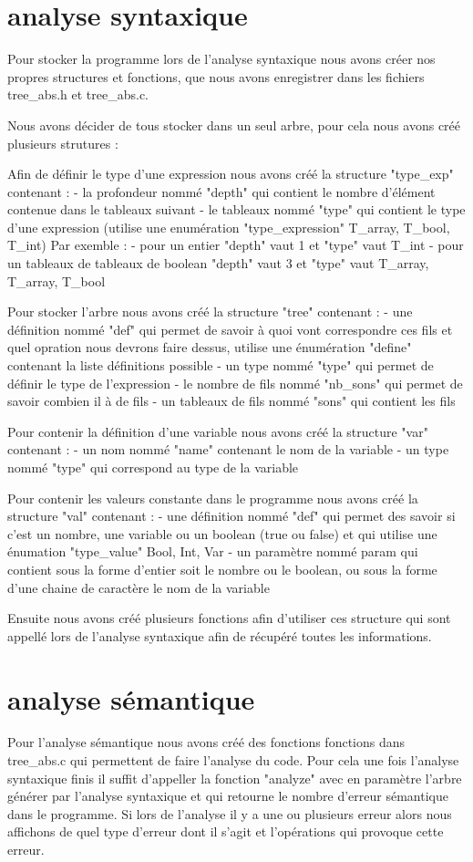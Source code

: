 ﻿\documentclass{report}
\begin{document}
\section{analyse syntaxique}
Pour stocker la programme lors de l'analyse syntaxique nous avons créer nos propres structures et fonctions, que nous avons enregistrer dans les fichiers tree_abs.h et tree_abs.c.

Nous avons décider de tous stocker dans un seul arbre, pour cela nous avons créé plusieurs strutures :

Afin de définir le type d'une expression nous avons créé la structure "type_exp" contenant :
	- la profondeur nommé "depth" qui contient le nombre d'élément contenue dans le tableaux suivant
	- le tableaux nommé "type" qui contient le type d'une expression (utilise une enumération "type_expression" {T_array, T_bool, T_int})
Par exemble :
	- pour un entier "depth" vaut 1 et "type" vaut {T_int}
	- pour un tableaux de tableaux de boolean "depth" vaut 3 et "type" vaut {T_array, T_array, T_bool}

Pour stocker l'arbre nous avons créé la structure "tree" contenant :
	- une définition nommé "def" qui permet de savoir à quoi vont correspondre ces fils et quel opration nous devrons faire dessus, utilise une énumération "define" contenant la liste définitions possible
	- un type nommé "type" qui permet de définir le type de l'expression
	- le nombre de fils nommé "nb_sons" qui permet de savoir combien il à de fils
	- un tableaux de fils nommé "sons" qui contient les fils
	
Pour contenir la définition d'une variable nous avons créé la structure "var" contenant :
	- un nom nommé "name" contenant le nom de la variable
	- un type nommé "type" qui correspond au type de la variable
	
Pour contenir les valeurs constante dans le programme nous avons créé la structure "val" contenant :
	- une définition nommé "def" qui permet des savoir si c'est un nombre, une variable ou un boolean (true ou false) et qui utilise une énumation "type_value" {Bool, Int, Var}
	- un paramètre nommé param qui contient sous la forme d'entier soit le nombre ou le boolean, ou sous la forme d'une chaine de caractère le nom de la variable

Ensuite nous avons créé plusieurs fonctions afin d'utiliser ces structure qui sont appellé lors de l'analyse syntaxique afin de récupéré toutes les informations. 

\section{analyse sémantique}
Pour l'analyse sémantique nous avons créé des fonctions fonctions dans tree_abs.c qui permettent de faire l'analyse du code.
Pour cela une fois l'analyse syntaxique finis il suffit d'appeller la fonction "analyze" avec en paramètre l'arbre générer par l'analyse syntaxique et qui retourne le nombre d'erreur sémantique dans le programme.
Si lors de l'analyse il y a une ou plusieurs erreur alors nous affichons de quel type d'erreur dont il s'agit et l'opérations qui provoque cette erreur.
\end{document}
